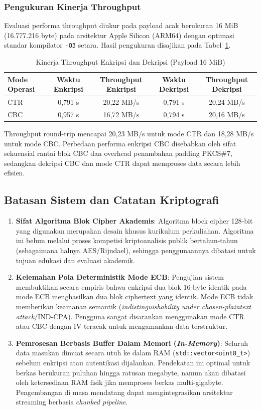 \subsubsection{Pengukuran Kinerja Throughput}
Evaluasi performa throughput diukur pada payload acak berukuran 16 MiB (16.777.216 byte) pada arsitektur Apple Silicon (ARM64) dengan optimasi standar kompilator \texttt{-O3} setara. Hasil pengukuran disajikan pada Tabel~\ref{tab:perf_benchmark}.

\begin{table}[ht]
\centering
\caption{Kinerja Throughput Enkripsi dan Dekripsi (Payload 16 MiB)}
\label{tab:perf_benchmark}
\begin{tabular}{|l|c|c|c|c|}
\hline
\textbf{Mode Operasi} & \textbf{Waktu Enkripsi} & \textbf{Throughput Enkripsi} & \textbf{Waktu Dekripsi} & \textbf{Throughput Dekripsi} \\
\hline
CTR & 0,791 s & 20,22 MB/s & 0,791 s & 20,24 MB/s \\
CBC & 0,957 s & 16,72 MB/s & 0,794 s & 20,16 MB/s \\
\hline
\end{tabular}
\end{table}
Throughput round-trip mencapai 20,23 MB/s untuk mode CTR dan 18,28 MB/s untuk mode CBC. Perbedaan performa enkripsi CBC disebabkan oleh sifat sekuensial rantai blok CBC dan overhead penambahan padding PKCS\#7, sedangkan dekripsi CBC dan mode CTR dapat memproses data secara lebih efisien.

\subsection{Batasan Sistem dan Catatan Kriptografi}

\begin{enumerate}
    \item \textbf{Sifat Algoritma Blok Cipher Akademis}: Algoritma block cipher 128-bit yang digunakan merupakan desain khusus kurikulum perkuliahan. Algoritma ini belum melalui proses kompetisi kriptoanalisis publik bertahun-tahun (sebagaimana halnya AES/Rijndael), sehingga penggunaannya dibatasi untuk tujuan edukasi dan evaluasi akademik.
    \item \textbf{Kelemahan Pola Deterministik Mode ECB}: Pengujian sistem membuktikan secara empiris bahwa enkripsi dua blok 16-byte identik pada mode ECB menghasilkan dua blok ciphertext yang identik. Mode ECB tidak memberikan keamanan semantik (\textit{indistinguishability under chosen-plaintext attack}/IND-CPA). Pengguna sangat disarankan menggunakan mode CTR atau CBC dengan IV teracak untuk mengamankan data terstruktur.
    \item \textbf{Pemrosesan Berbasis Buffer Dalam Memori (\textit{In-Memory})}: Seluruh data masukan dimuat secara utuh ke dalam RAM (\texttt{std::vector<uint8\_t>}) sebelum enkripsi atau autentikasi dijalankan. Pendekatan ini optimal untuk berkas berukuran puluhan hingga ratusan megabyte, namun akan dibatasi oleh ketersediaan RAM fisik jika memproses berkas multi-gigabyte. Pengembangan di masa mendatang dapat mengintegrasikan arsitektur streaming berbasis \textit{chunked pipeline}.
\end{enumerate}
